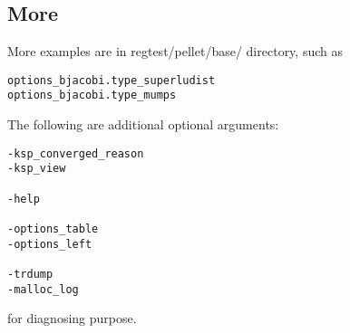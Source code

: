 \subsection{More}

\noindent
More examples are in regtest/pellet/base/ directory, such as 

\begin{verbatim}
options_bjacobi.type_superludist
options_bjacobi.type_mumps 
\end{verbatim}

\noindent
The following are additional optional arguments:

\begin{verbatim}
-ksp_converged_reason
-ksp_view

-help

-options_table
-options_left

-trdump
-malloc_log
\end{verbatim}

for diagnosing purpose.
